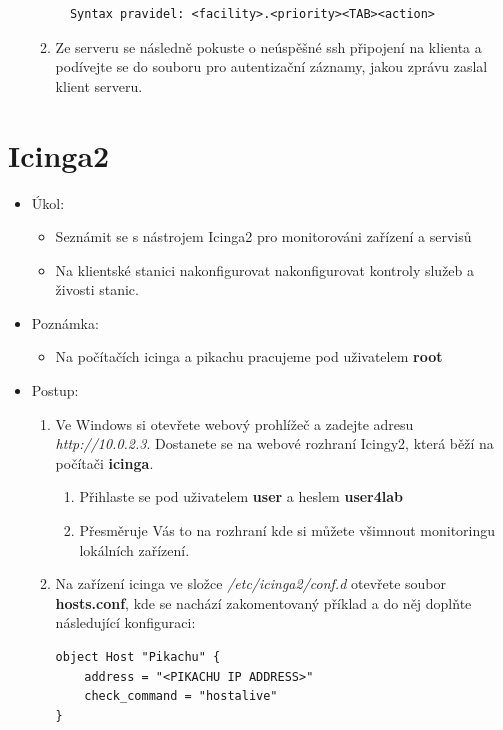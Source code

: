 \begin{itemize}
\begin{enumerate}
\begin{verbatim} 
  Syntax pravidel: <facility>.<priority><TAB><action>
\end{verbatim} 
         \item Ze serveru se následně pokuste o neúspěšné ssh připojení na klienta a podívejte se
         do souboru pro autentizační záznamy, jakou zprávu zaslal klient serveru.


       \end{enumerate}
   \end{itemize}

\section{Icinga2}
  \begin{itemize}
    \item Úkol: 
    \begin{itemize}
      \item Seznámit se s nástrojem Icinga2 pro monitorováni zařízení a servisů 
      \item Na klientské stanici nakonfigurovat nakonfigurovat kontroly služeb a
        živosti stanic.  
    \end{itemize}
    \item Poznámka:
        \begin{itemize}
            \item Na počítačích icinga a pikachu pracujeme pod uživatelem \textbf{root}
        \end{itemize}
    \item Postup:
       \begin{enumerate}   
            \item Ve Windows si otevřete webový prohlížeč a zadejte adresu 
            \textit{http://10.0.2.3}. Dostanete se na webové rozhraní Icingy2,
            která běží na počítači \textbf{icinga}.
               \begin{enumerate}
                   \item Přihlaste se pod uživatelem \textbf{user} a heslem \textbf{user4lab}
                    \item Přesměruje Vás to na rozhraní kde si můžete všimnout
                      monitoringu lokálních zařízení.
               \end{enumerate}
            \item Na zařízení icinga ve složce \textit{/etc/icinga2/conf.d} otevřete soubor \textbf{hosts.conf}, kde se nachází zakomentovaný příklad a do něj doplňte následující konfiguraci:
\begin{verbatim}
object Host "Pikachu" {
    address = "<PIKACHU IP ADDRESS>"
    check_command = "hostalive"
}


\end{verbatim}
\end{enumerate}
\end{itemize}
